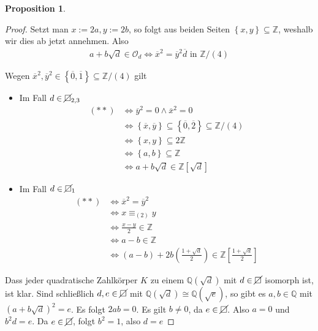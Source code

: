\documentclass[
twoside=semi,
fontsize=12,
DIV=12, 
cleardoublepage=current,
leqno,
headings=optiontoheadandtoc, 
toc=idx
]{scrbook}
\newcommand{\Z}{\mathbb{Z}}
\newcommand{\Q}{\mathbb{Q}}
\newcommand{\nsquare}{\cancel{\square}}
\newcommand{\brac}[1]{\left( #1 \right)}
\newcommand{\set}[1]{\left\{ #1 \right\}}
\theoremstyle{definition}
\newtheorem{proposition}[definition]{Proposition}
\begin{document}
\begin{proposition}
\begin{proof}
 		Setzt man $x:= 2a, y:= 2b$, so folgt aus beiden Seiten $\set{x,y} \subseteq \Z$, weshalb wir dies ab jetzt annehmen. Also 
 		\begin{align}
 			a+b\sqrt{d}\in \mathcal{O}_d \Leftrightarrow \overline{x}^2 = \overline{y}^2\overline{d} \textrm{ in } \Z/(4) \label{2.1.17.2}\tag{$**$}
 		\end{align}
 		
 		Wegen $\overline{x}^2, \overline{y}^2 \in \set{\overline{0},\overline{1}}\subseteq \Z/(4)$ gilt
 		
 		\begin{itemize}
 			\item Im Fall $d\in \nsquare_{2,3}$
 			\begin{align*}
 				(**) &\Leftrightarrow \overline{y}^2 = 0 \land \overline{x}^2 = 0\\
 				&\Leftrightarrow \set{\overline{x},\overline{y}} \subseteq \set{\overline{0}, \overline{2}} \subseteq \Z/(4)\\
 				&\Leftrightarrow \set{x,y} \subseteq 2\Z\\
 				&\Leftrightarrow \set{a,b}\subseteq \Z\\
 				&\Leftrightarrow a+b\sqrt{d} \in \Z[\sqrt{d}]
 			\end{align*}
 			
 			\item Im Fall $d\in \nsquare_{1}$
 			\begin{align*}
 				(**) &\Leftrightarrow \overline{x}^2 = \overline{y}^2\\
 				&\Leftrightarrow x \equiv_{(2)} y\\
 				&\Leftrightarrow\frac{x-y}{2} \in \Z\\
 				&\Leftrightarrow a-b \in \Z\\
 				&\Leftrightarrow (a-b) + 2b\brac{\frac{1+\sqrt{d}}{2}} \in \Z\left[\frac{1+\sqrt{d}}{2}\right]
 			\end{align*}
 		\end{itemize}
 	
 		Dass jeder quadratische Zahlk\"orper $K$ zu einem $\Q(\sqrt{d})$ mit $d\in \nsquare$ isomorph ist, ist klar.
 		Sind schlie\ss lich $d,e\in \nsquare$ mit $\Q(\sqrt{d}) \cong \Q(\sqrt{e})$, so gibt es $a,b\in \Q$ mit $(a+b\sqrt{d})^2 = e$. Es folgt $2ab = 0$. Es gilt $b\neq 0$, da $e \in \nsquare$. Also
 		$a = 0$ und $b^2d = e$. Da $e\in \nsquare$, folgt $b^2=1$, also $d=e$
 	\end{proof}
 	\end{proposition}
 	\newpage
 	
\end{document}
